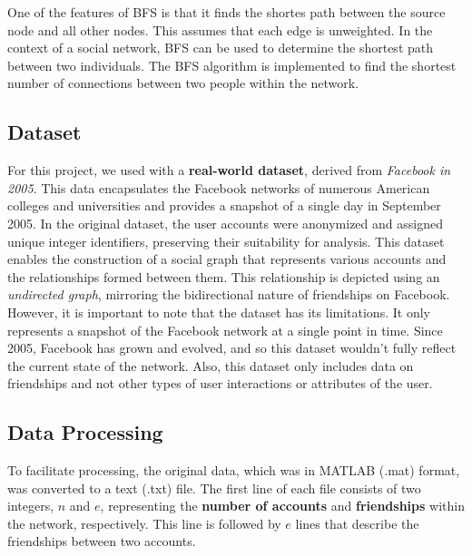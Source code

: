 One of the features of BFS is that it finds the shortes path between the source node and all other nodes. This assumes that each edge is unweighted. In the context of a social network, BFS can be used to determine the shortest path between two individuals. The BFS algorithm is implemented to find the shortest number of connections between two people within the network.

\subsection*{\textbf{Dataset}}

For this project, we used with a \textbf{real-world dataset}, derived from \textit{Facebook in 2005}. This data encapsulates the Facebook networks of numerous American colleges and universities and provides a snapshot of a single day in September 2005. In the original dataset, the user accounts were anonymized and assigned unique integer identifiers, preserving their suitability for analysis. This dataset enables the construction of a social graph that represents various accounts and the relationships formed between them. This relationship is depicted using an \textit{undirected graph}, mirroring the bidirectional nature of friendships on Facebook. \cite{traud2012social}
However, it is important to note that the dataset has its limitations. It only represents a snapshot of the Facebook network at a single point in time. Since 2005, Facebook has grown and evolved, and so this dataset wouldn't fully reflect the current state of the network. Also, this dataset only includes data on friendships and not other types of user interactions or attributes of the user.

\subsection*{\textbf{Data Processing}}

To facilitate processing, the original data, which was in MATLAB (.mat) format, was converted to a text (.txt) file. The first line of each file consists of two integers, $n$ and $e$, representing the \textbf{number of accounts} and \textbf{friendships} within the network, respectively. This line is followed by $e$ lines that describe the friendships between two accounts.